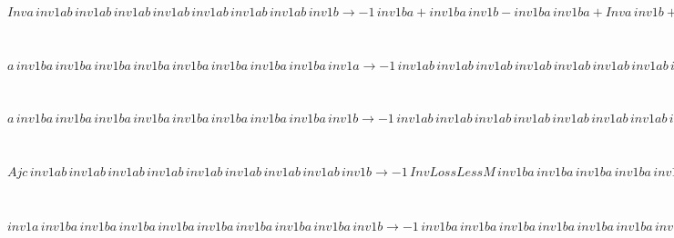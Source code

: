 \begin{minipage}{6in}
$
Inva\,
 inv1ab\,
 inv1ab\,
 inv1ab\,
 inv1ab\,
 inv1ab\,
 inv1ab\,
 inv1ab\,
 inv1b\rightarrow -1\,
 inv1ba + inv1ba\,
 inv1b - inv1ba\,
 inv1ba + Inva\,
 inv1b + inv1ba\,
 inv1ba\,
 inv1b - inv1ba\,
 inv1ba\,
 inv1ba + inv1ba\,
 inv1ba\,
 inv1ba\,
 inv1b - inv1ba\,
 inv1ba\,
 inv1ba\,
 inv1ba + inv1ba\,
 inv1ba\,
 inv1ba\,
 inv1ba\,
 inv1b - inv1ba\,
 inv1ba\,
 inv1ba\,
 inv1ba\,
 inv1ba + inv1ba\,
 inv1ba\,
 inv1ba\,
 inv1ba\,
 inv1ba\,
 inv1b - inv1ba\,
 inv1ba\,
 inv1ba\,
 inv1ba\,
 inv1ba\,
 inv1ba + inv1ba\,
 inv1ba\,
 inv1ba\,
 inv1ba\,
 inv1ba\,
 inv1ba\,
 inv1b - inv1ba\,
 inv1ba\,
 inv1ba\,
 inv1ba\,
 inv1ba\,
 inv1ba\,
 inv1ba + inv1ba\,
 inv1ba\,
 inv1ba\,
 inv1ba\,
 inv1ba\,
 inv1ba\,
 inv1ba\,
 inv1b
$
\end{minipage}\medskip \\
\begin{minipage}{6in}
$
a\,
 inv1ba\,
 inv1ba\,
 inv1ba\,
 inv1ba\,
 inv1ba\,
 inv1ba\,
 inv1ba\,
 inv1ba\,
 inv1a\rightarrow -1\,
 inv1ab\,
 inv1ab\,
 inv1ab\,
 inv1ab\,
 inv1ab\,
 inv1ab\,
 inv1ab\,
 inv1ab + inv1ab\,
 inv1ab\,
 inv1ab\,
 inv1ab\,
 inv1ab\,
 inv1ab\,
 inv1ab\,
 inv1ab\,
 inv1a
$
\end{minipage}\medskip \\
\begin{minipage}{6in}
$
a\,
 inv1ba\,
 inv1ba\,
 inv1ba\,
 inv1ba\,
 inv1ba\,
 inv1ba\,
 inv1ba\,
 inv1ba\,
 inv1b\rightarrow -1\,
 inv1ab\,
 inv1ab\,
 inv1ab\,
 inv1ab\,
 inv1ab\,
 inv1ab\,
 inv1ab\,
 inv1b + a\,
 inv1ba\,
 inv1ba\,
 inv1ba\,
 inv1ba\,
 inv1ba\,
 inv1ba\,
 inv1ba\,
 inv1ba + inv1ab\,
 inv1ab\,
 inv1ab\,
 inv1ab\,
 inv1ab\,
 inv1ab\,
 inv1ab\,
 inv1ab\,
 inv1b
$
\end{minipage}\medskip \\
\begin{minipage}{6in}
$
Ajc\,
 inv1ab\,
 inv1ab\,
 inv1ab\,
 inv1ab\,
 inv1ab\,
 inv1ab\,
 inv1ab\,
 inv1ab\,
 inv1b\rightarrow -1\,
 InvLossLessM\,
 inv1ba\,
 inv1ba\,
 inv1ba\,
 inv1ba\,
 inv1ba\,
 inv1ba\,
 inv1ba\,
 inv1ba + InvLossLessM\,
 inv1ba\,
 inv1ba\,
 inv1ba\,
 inv1ba\,
 inv1ba\,
 inv1ba\,
 inv1ba\,
 inv1ba\,
 inv1b
$
\end{minipage}\medskip \\
\begin{minipage}{6in}
$
inv1a\,
 inv1ba\,
 inv1ba\,
 inv1ba\,
 inv1ba\,
 inv1ba\,
 inv1ba\,
 inv1ba\,
 inv1ba\,
 inv1b\rightarrow -1\,
 inv1ba\,
 inv1ba\,
 inv1ba\,
 inv1ba\,
 inv1ba\,
 inv1ba\,
 inv1ba\,
 inv1ba - inv1a\,
 inv1ab\,
 inv1ab\,
 inv1ab\,
 inv1ab\,
 inv1ab\,
 inv1ab\,
 inv1ab\,
 inv1b + inv1a\,
 inv1ba\,
 inv1ba\,
 inv1ba\,
 inv1ba\,
 inv1ba\,
 inv1ba\,
 inv1ba\,
 inv1ba + inv1ba\,
 inv1ba\,
 inv1ba\,
 inv1ba\,
 inv1ba\,
 inv1ba\,
 inv1ba\,
 inv1ba\,
 inv1b + inv1a\,
 inv1ab\,
 inv1ab\,
 inv1ab\,
 inv1ab\,
 inv1ab\,
 inv1ab\,
 inv1ab\,
 inv1ab\,
 inv1b
$
\end{minipage}\medskip \\

